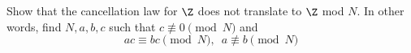 \begin{ex}
  Show that the cancellation law for $\Z$ does not translate to $\Z$ mod $N$.
  In other words, find $N, a, b, c$ such that $c \not\equiv 0 \pmod{N}$ and
  \[
  ac \equiv bc \pmod{N}, \,\,\, a \not\equiv b \pmod{N}
  \]
\end{ex}

\newpage
\newpage
\newpage
\newpage
\newpage
\newpage
